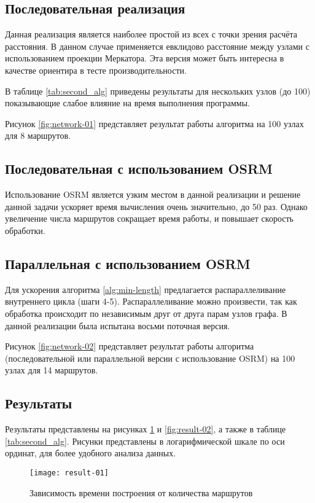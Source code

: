 \subsection{Последовательная реализация}
Данная реализация является наиболее простой из всех с точки зрения расчёта расстояния. В данном случае 
применяется евклидово расстояние между узлами с использованием проекции Меркатора. Эта версия может быть 
интересна в качестве ориентира в тесте производительности.

В таблице \ref{tab:second_alg} приведены результаты для нескольких узлов (до 100) показывающие слабое влияние 
на время выполнения программы.

Рисунок \ref{fig:network-01} представляет результат работы алгоритма на 100 узлах для 8 маршрутов.

\subsection{Последовательная с использованием OSRM}
Использование OSRM является узким местом в данной реализации и решение данной задачи ускоряет время 
вычисления очень значительно, до 50 раз. Однако увеличение числа маршрутов сокращает время работы, и повышает 
скорость обработки.

\subsection{Параллельная с использованием OSRM}
Для ускорения алгоритма \ref{alg:min-length} предлагается распараллеливание внутреннего цикла (шаги 4-5).
Распараллеливание можно произвести, так как обработка происходит по независимым друг от друга парам узлов 
графа. В данной реализации была испытана восьми поточная версия.

Рисунок \ref{fig:network-02} представляет результат работы алгоритма (последовательной или параллельной 
версии с использование OSRM) на 100 узлах для 14 маршрутов.

\subsection{Результаты}
Результаты представлены на рисунках \ref{fig:result-01} и \ref{fig:result-02}, а также в таблице 
\ref{tab:second_alg}. Рисунки представлены в логарифмической шкале по оси ординат, для более удобного 
анализа данных.

\begin{figure}[ht!]
    \centering
    \texttt{[image: result-01]}
    \caption{Зависимость времени построения от количества маршрутов}
    \label{fig:result-01}
\end{figure}

